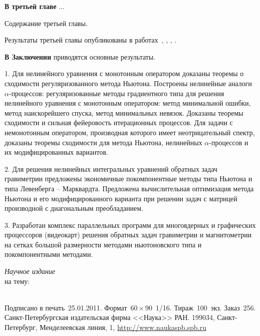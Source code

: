 \documentclass[%
autoref,     %
href,        %
facsimile,   %
colorlinks,  %
]{disser}
\begin{document}
\textbf{В третьей главе} ...

Содержание третьей главы.

Результаты третьей главы опубликованы в работах~\cite{AkSkur2014}, \cite{AkSkur2015}, \cite{AkSkur2016}, \cite{Skur2017_2}.

\textbf{В Заключении} приводятся основные результаты.


1. Для нелинейного уравнения с монотонным оператором доказаны теоремы о сходимости регуляризованного метода Ньютона. 
Построены нелинейные аналоги $\alpha$-процессов:  регуляризованные методы градиентного типа для решения нелинейного уравнения с монотонным оператором: метод минимальной ошибки, метод наискорейшего спуска, метод минимальных невязок. Доказаны теоремы сходимости и сильная фейеровость итерационных процессов. Для задачи с немонотонным оператором, производная которого имеет неотрицательный спектр, доказаны теоремы сходимости для метода  Ньютона, нелинейных $\alpha$-процессов и их модифицированных вариантов.

2. Для решения нелинейных интегральных уравнений обратных задач гравиметрии предложены экономичные покомпонентные методы 
типа Ньютона и типа Левенберга – Марквардта. Предложена вычислительная оптимизация метода 
Ньютона и его модифицированного варианта при решении задач 
с матрицей производной с диагональным преобладанием. 

3. Разработан комплекс параллельных программ для многоядерных и графических процессоров (видеокарт) решения обратных задач гравиметрии и магнитометрии на сетках большой размерности методами ньютоновского типа и покомпонентными методами. 


\printbibheading[title={Основные публикации по теме диссертации}]
\printbibliography[
heading=subbibliography,
keyword=hac,
title={Статьи в изданиях из перечня ВАК, SCOPUS}
]

\printbibliography[
heading=subbibliography,
keyword=nohac,
title={Другие публикации}
]

\clearpage
\thispagestyle{empty}
\normalfont\selectfont
\vspace*{2cm}
\begin{center}
\textit{Научное издание}\\
\vskip 2cm
\makeatletter
\@author
\vskip 1.5cm
\@title{} на тему:\\
\@topic\\
\makeatother
\end{center}
\vfill
Подписано в печать~25.01.2011.
Формат~$60 \times 90$~1/16.
Тираж~100~экз.
Заказ~256.\\[2ex]
\noindent
Санкт-Петербургская издательская фирма <<Наука>> РАН.
199034, Санкт-Петербург, Менделеевская линия, 1,
\href{http://www.naukaspb.spb.ru}{http://www.naukaspb.spb.ru}
\end{document}
